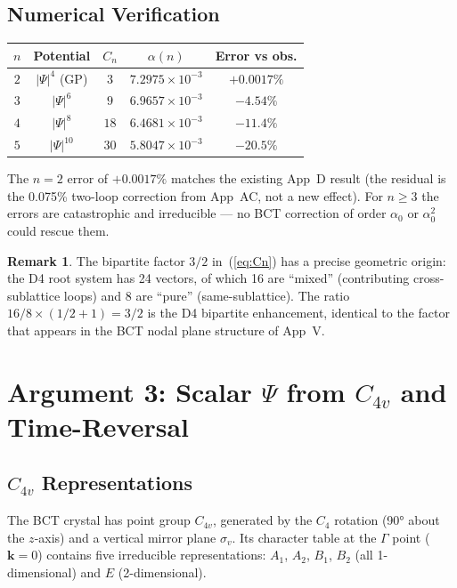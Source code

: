 \documentclass[11pt,a4paper]{article}
\theoremstyle{bctthm}
\theoremstyle{definition}
\newtheorem{remark}{Remark}
\begin{document}
\subsection{Numerical Verification}

\begin{center}
\renewcommand{\arraystretch}{1.35}
\begin{tabular}{ccccc}
\toprule
$n$ & Potential & $C_n$ & $\alpha(n)$ & Error vs obs. \\
\midrule
$2$ & $|\Psi|^4$ (GP) & $3$ & $7.2975\times10^{-3}$ & $+0.0017\%$ \\
$3$ & $|\Psi|^6$ & $9$ & $6.9657\times10^{-3}$ & $-4.54\%$ \\
$4$ & $|\Psi|^8$ & $18$ & $6.4681\times10^{-3}$ & $-11.4\%$ \\
$5$ & $|\Psi|^{10}$ & $30$ & $5.8047\times10^{-3}$ & $-20.5\%$ \\
\bottomrule
\end{tabular}
\end{center}

The $n=2$ error of $+0.0017\%$ matches the existing App~D result
(the residual is the 0.075\% two-loop correction from App~AC,
not a new effect). For $n \geq 3$ the errors are catastrophic
and irreducible — no BCT correction of order $\alpha_0$ or
$\alpha_0^2$ could rescue them.

\begin{remark}
The bipartite factor $3/2$ in~(\ref{eq:Cn}) has a precise geometric
origin: the D4 root system has 24 vectors, of which 16 are
``mixed'' (contributing cross-sublattice loops) and 8 are
``pure'' (same-sublattice). The ratio $16/8 \times (1/2 + 1) = 3/2$
is the D4 bipartite enhancement, identical to the factor that
appears in the BCT nodal plane structure of App~V.
\end{remark}

\section{Argument 3: Scalar $\Psi$ from $C_{4v}$ and Time-Reversal}

\subsection{$C_{4v}$ Representations}

The BCT crystal has point group $C_{4v}$, generated by the
$C_4$ rotation (90° about the $z$-axis) and a vertical mirror
plane $\sigma_v$. Its character table at the $\Gamma$ point
($\mathbf{k}=0$) contains five irreducible representations:
$A_1$, $A_2$, $B_1$, $B_2$ (all 1-dimensional) and $E$ (2-dimensional).
\end{document}
